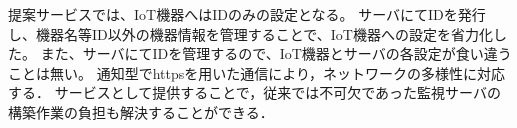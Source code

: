 提案サービスでは、IoT機器へはIDのみの設定となる。
サーバにてIDを発行し、機器名等ID以外の機器情報を管理することで、IoT機器への設定を省力化した。
また、サーバにてIDを管理するので、IoT機器とサーバの各設定が食い違うことは無い。
通知型でhttpsを用いた通信により，ネットワークの多様性に対応する．
サービスとして提供することで，従来では不可欠であった監視サーバの構築作業の負担も解決することができる．

